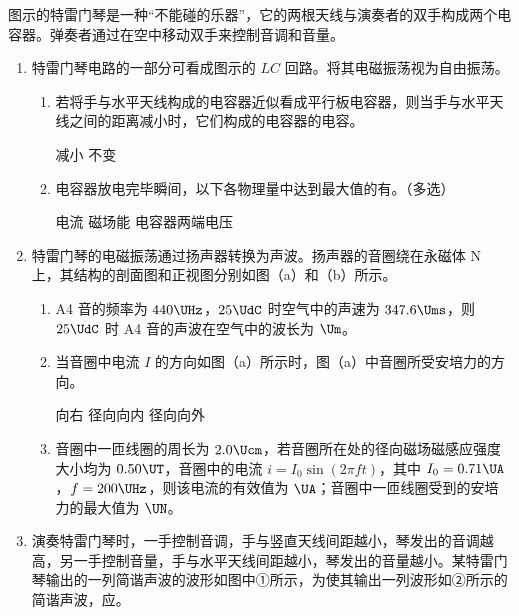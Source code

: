 \documentclass[\gkver]{gaokaozhenti}
\begin{document}
\begin{enumerate}
图示的特雷门琴是一种“不能碰的乐器”，它的两根天线与演奏者的双手构成两个电容器。弹奏者通过在空中移动双手来控制音调和音量。

\onepicture[align=right, w=3.72cm]{}
\begin{enumerate}
	\item
	特雷门琴电路的一部分可看成图示的 $LC$ 回路。将其电磁振荡视为自由振荡。

	\onepicture[align=right, w=2.56cm]{}

	\begin{enumerate}
		\item
		若将手与水平天线构成的电容器近似看成平行板电容器，则当手与水平天线之间的距离减小时，它们构成的电容器的电容。

		{减小}
		{不变}

		\item
		电容器放电完毕瞬间，以下各物理量中达到最大值的有。（多选）

		{电流}
		{磁场能}
		{电容器两端电压}
	\end{enumerate}

	\item
	特雷门琴的电磁振荡通过扬声器转换为声波。扬声器的音圈绕在永磁体 N 上，其结构的剖面图和正视图分别如图（a）和（b）所示。


	\begin{enumerate}
		\item
		A4 音的频率为 $440 \UHz$，$25\UdC$ 时空气中的声速为 $347.6 \Ums$，则 $25\UdC$ 时 A4 音的声波在空气中的波长为 $\Um$。

		\item
		当音圈中电流 $I$ 的方向如图（a）所示时，图（a）中音圈所受安培力的方向。

		{向右}
		{径向向内}
		{径向向外}

		\item
		音圈中一匝线圈的周长为 $2.0 \Ucm$，若音圈所在处的径向磁场磁感应强度大小均为 $0.50 \UT$，音圈中的电流 $i=I_{0}\sin(2\pi ft)$，其中 $I_{0}=0.71 \UA$，$f=200 \UHz$，则该电流的有效值为 $\UA$；音圈中一匝线圈受到的安培力的最大值为 $\UN$。
	\end{enumerate}

	\item
	演奏特雷门琴时，一手控制音调，手与竖直天线间距越小，琴发出的音调越高，另一手控制音量，手与水平天线间距越小，琴发出的音量越小。某特雷门琴输出的一列简谐声波的波形如图中①所示，为使其输出一列波形如②所示的简谐声波，应。


\end{enumerate}
\end{enumerate}
\end{document}
